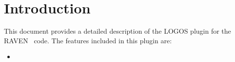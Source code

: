 \section{Introduction}
\label{sec:Introduction}

This document provides a detailed description of the LOGOS plugin for the RAVEN~\cite{RAVEN,RAVENtheoryMan} code.
The features included in this plugin are:
\begin{itemize}
	\item []
\end{itemize}
